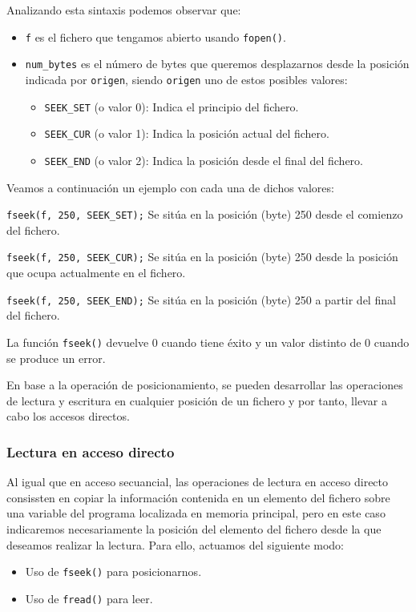 {Analizando esta sintaxis podemos observar que:
\begin{itemize}
	\item \texttt{f} es el fichero que tengamos abierto usando \texttt{fopen()}.
	\item \texttt{num\_bytes} es el número de bytes que queremos desplazarnos desde la posición indicada por \texttt{origen}, siendo \texttt{origen} uno de estos posibles valores:
	\begin{itemize}
		\item \texttt{SEEK\_SET} (o valor 0): Indica el principio del fichero.
		\item \texttt{SEEK\_CUR} (o valor 1): Indica la posición actual del fichero.
		\item \texttt{SEEK\_END} (o valor 2): Indica la posición desde el final del fichero.
	\end{itemize}
\end{itemize}
Veamos a continuación un ejemplo con cada una de dichos valores:
\begin{Ejemplo}
	\texttt{fseek(f, 250, SEEK\_SET);}
\Explicacion
Se sitúa en la posición (byte) 250 desde el comienzo del fichero.
\end{Ejemplo}
\begin{Ejemplo}
	\texttt{fseek(f, 250, SEEK\_CUR);}
	\Explicacion
	Se sitúa en la posición (byte) 250 desde la posición que ocupa actualmente en el fichero.
\end{Ejemplo}
\begin{Ejemplo}
	\texttt{fseek(f, 250, SEEK\_END);}
	\Explicacion
	Se sitúa en la posición (byte) 250 a partir del final del fichero.\\
\end{Ejemplo}

La función \texttt{fseek()} devuelve 0 cuando tiene éxito y un valor distinto de 0 cuando se produce un error.

En base a la operación de posicionamiento, se pueden desarrollar las operaciones de lectura y escritura en cualquier posición de un fichero y por tanto, llevar a cabo los accesos directos.
\subsubsection{Lectura en acceso directo}{
Al igual que en acceso secuancial, las operaciones de lectura en acceso directo consissten en copiar la información contenida en un elemento del fichero sobre una variable del programa localizada en memoria principal, pero en este caso indicaremos necesariamente la posición del elemento del fichero desde la que deseamos realizar la lectura. Para ello, actuamos del siguiente modo:
\begin{itemize}
	\item Uso de \texttt{fseek()} para posicionarnos.
	\item Uso de \texttt{fread()} para leer.
\end{itemize}
}
}
